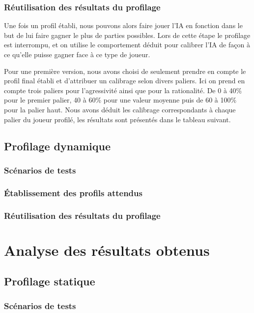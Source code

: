 \documentclass{report}
\begin{document}
\subsection{Réutilisation des résultats du profilage}

\hspace{0.5cm}Une fois un profil établi, nous pouvons alors faire jouer l'IA en fonction dans le but de lui faire gagner le plus de parties possibles. Lors de cette étape le profilage est interrompu, et on utilise le comportement déduit pour calibrer l'IA de façon à ce qu'elle puisse gagner face à ce type de joueur.\par
Pour une première version, nous avons choisi de seulement prendre en compte le profil final établi et d'attribuer un calibrage selon divers paliers. Ici on prend en compte trois paliers pour l'agressivité ainsi que pour la rationalité. De 0 à 40\% pour le premier palier, 40 à 60\% pour une valeur moyenne puis de 60 à 100\% pour la palier haut. Nous avons déduit les calibrage correspondants à chaque palier du joueur profilé, les résultats sont présentés dans le tableau suivant.\\


\section{Profilage dynamique}
\subsection{Scénarios de tests}
\subsection{Établissement des profils attendus}
\subsection{Réutilisation des résultats du profilage}


\chapter{Analyse des résultats obtenus}

\section{Profilage statique}
\subsection{Scénarios de tests}
\end{document}
